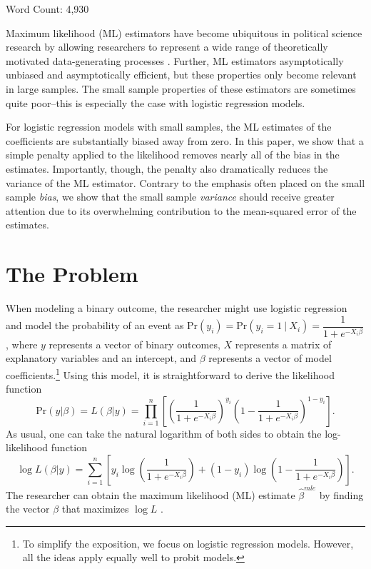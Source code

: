 \documentclass[12pt]{article}
\begin{document}
 \vspace{5mm}
 \begin{center}
 Word Count: 4,930
 \end{center}

\thispagestyle{empty}

\newpage
\doublespace

Maximum likelihood (ML) estimators have become ubiquitous in political science research by allowing researchers to represent a wide range of theoretically motivated data-generating processes \citep{King1989}. 
Further, ML estimators asymptotically unbiased and asymptotically efficient, but these properties only become relevant in large samples. 
The small sample properties of these estimators are sometimes quite poor--this is especially the case with logistic regression models. 

For logistic regression models with small samples, the ML estimates of the coefficients are substantially biased away from zero. 
In this paper, we show that a simple penalty applied to the likelihood removes nearly all of the bias in the estimates. 
Importantly, though, the penalty also dramatically reduces the variance of the ML estimator.
Contrary to the emphasis often placed on the small sample \textit{bias}, we show that the small sample \textit{variance} should receive greater attention due to its overwhelming contribution to the mean-squared error of the estimates.

\section*{The Problem}

When modeling a binary outcome, the researcher might use logistic regression and model the probability of an event as $\text{Pr}(y_i) = \text{Pr}(y_i = 1~|~ X_i) = \dfrac{1}{1 + e^{-X_i\beta}}$, where $y$ represents a vector of binary outcomes, $X$ represents a matrix of explanatory variables and an intercept, and $\beta$ represents a vector of model coefficients.\footnote{To simplify the exposition, we focus on logistic regression models. However, all the ideas apply equally well to probit models.}
Using this model, it is straightforward to derive the likelihood function 
\begin{equation}\nonumber
\text{Pr}(y | \beta) = L(\beta | y) = \displaystyle \prod_{i = 1}^n \left[\left( \dfrac{1}{1 + e^{-X_i\beta}}\right)^{y_i}\left(1- \dfrac{1}{1 + e^{-X_i\beta}}\right)^{1 - y_i}\right]\text{.}
\end{equation}
\noindent As usual, one can take the natural logarithm of both sides to obtain the log-likelihood function 
\begin{equation}\nonumber
\log L(\beta | y) = \displaystyle \sum_{i = 1}^n \left[y_i \log \left( \dfrac{1}{1 + e^{-X_i\beta}}\right) + (1 - y_i) \log \left(1- \dfrac{1}{1 + e^{-X_i\beta}}\right)\right].
\end{equation}
\noindent The researcher can obtain the maximum likelihood (ML) estimate $\hat{\beta}^{mle}$ by finding the vector $\beta$ that maximizes $\log L$ \citep{King1989}. 
\end{document}
